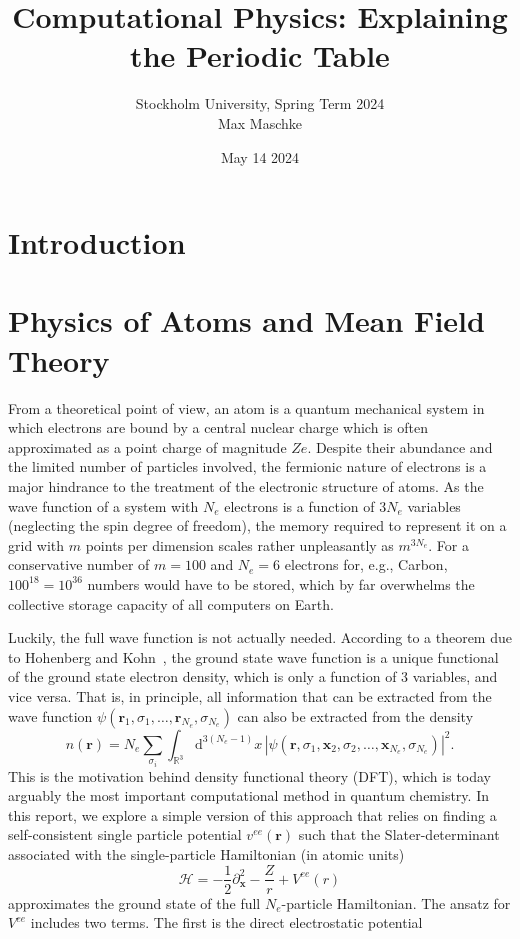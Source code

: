\documentclass[a4paper,DIV=12,english]{scrartcl}
\title{Computational Physics: Explaining the Periodic Table}
\author{Stockholm University, Spring Term 2024 \\Max Maschke}
\date{May 14 2024}
\begin{document}
\maketitle


\tableofcontents
\newpage


\newpage
\section{Introduction}\cite{github}

\section{Physics of Atoms and Mean Field Theory}
From a theoretical point of view, an atom is a quantum mechanical system in which electrons are bound by a central nuclear charge which is often approximated as a point charge of magnitude $Ze$. Despite their abundance and the limited number of particles involved, the fermionic nature of electrons is a major hindrance to the treatment of the electronic structure of atoms. As the wave function of a system with $N_e$ electrons is a function of $3N_e$ variables (neglecting the spin degree of freedom), the memory required to represent it on a grid with $m$ points per dimension scales rather unpleasantly as $m^{3N_e}$. For a conservative number of $m=100$ and $N_e=6$ electrons for, e.g., Carbon, $100^{18}=10^{36}$ numbers would have to be stored, which by far overwhelms the collective storage capacity of all computers on Earth. %

Luckily, the full wave function is not actually needed. According to a theorem due to Hohenberg and Kohn~\cite{kohn_hohenberg}, the ground state wave function is a unique functional of the ground state electron density, which is only a function of 3 variables, and vice versa. That is, in principle, all information that can be extracted from the wave function $\psi(\textbf{r}_1,\sigma_1, \dots, \textbf{r}_{N_e},\sigma_{N_e})$ can also be extracted from the density
\begin{equation}
    n(\textbf{r}) = N_e \sum_{\sigma_i}\int_{\mathbb{R}^3} \text{d}^{3(N_e-1)}x\,\left|\psi(\textbf{r},\sigma_1,\textbf{x}_2,\sigma_2,\dots,\textbf{x}_{N_e},\sigma_{N_e})\right|^2.
\end{equation}
This is the motivation behind density functional theory (DFT), which is today arguably the most important computational method in quantum chemistry. In this report, we explore a simple version of this approach that relies on finding a self-consistent single particle potential $v^{ee}(\textbf{r})$ such that the Slater-determinant associated with the single-particle Hamiltonian (in atomic units)
\begin{equation}
    \mathcal{H} = -\frac{1}{2}\partial_\textbf{x}^2 - \frac{Z}{r} + V^{ee}(r)
\end{equation}
approximates the ground state of the full $N_e$-particle Hamiltonian. The ansatz for $V^{ee}$ includes two terms. The first is the direct electrostatic potential 
\end{document}
